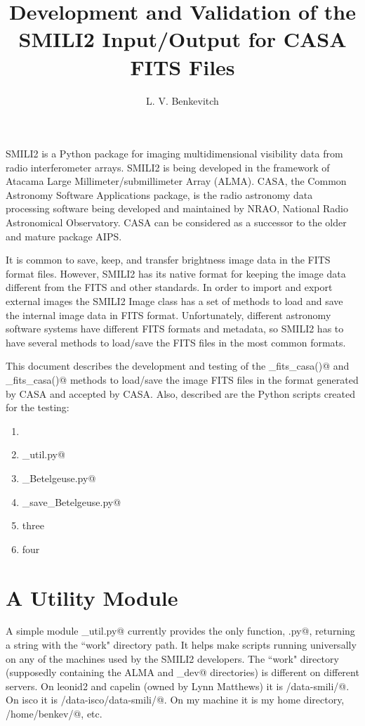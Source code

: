 \documentclass[preprint]{aastex}
\begin{document}
\title{Development and Validation of the SMILI2 Input/Output for CASA FITS Files}

\author{L. V. Benkevitch}

SMILI2 is a Python package for imaging multidimensional visibility data from radio interferometer arrays. SMILI2 is being developed in the framework of Atacama Large Millimeter/submillimeter Array (ALMA). CASA, the Common Astronomy Software Applications package, is the radio astronomy data processing software being developed and maintained by NRAO, National Radio Astronomical Observatory. CASA can be considered as a successor to the older and mature package AIPS. 

It is common to save, keep, and transfer brightness image data in the FITS format files. However, SMILI2 has its native format for keeping the image data different from the FITS and other standards. In order to import and export external images the SMILI2 Image class has a set of methods to load and save the internal image data in FITS format. Unfortunately, different astronomy software systems have different FITS formats and metadata, so SMILI2 has to have several methods to load/save the FITS files in the most common formats.

This document describes the development and testing of the \verb@load_fits_casa()@ and \verb@to_fits_casa()@ methods to load/save the image FITS files in the format generated by CASA and accepted by CASA. Also, described are the Python scripts created for the testing: 

\begin{enumerate}
  \item \verb@@
  \item \verb@alma_util.py@
  \item \verb@RoundSpottyDisk_Betelgeuse.py@
  \item \verb@load_save_Betelgeuse.py@
  \item three
  \item four
\end{enumerate}


\section{A Utility Module}

A simple module \verb@alma_util.py@ currently provides the only function, \verb@workdir.py@, returning a string with the ``work" directory path. It helps make scripts running universally on any of the machines used by the SMILI2 developers. The ``work" directory (supposedly containing the ALMA and _dev@ directories) is different on different servers. On leonid2 and capelin (owned by Lynn Matthews) it is \verb@/data-smili/@. On isco it is \verb@/data-isco/data-smili/@. On my machine it is my home directory, \verb@/home/benkev/@, etc. 
\end{document}
